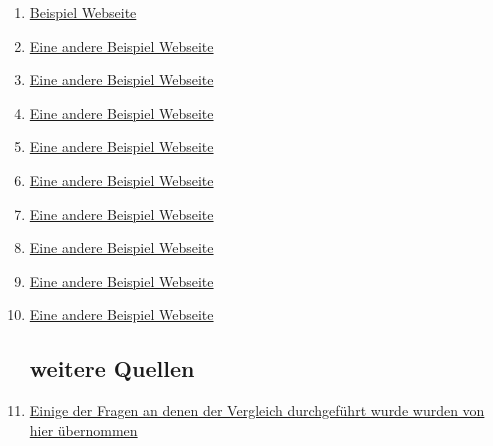 \documentclass[12pt]{article}
\begin{document}
	\begin{enumerate}
		\item \href{https://example.com}{Beispiel Webseite}
		\item \href{https://example.org}{Eine andere Beispiel Webseite}
		\item \href{https://example.org}{Eine andere Beispiel Webseite}
		\item \href{https://example.org}{Eine andere Beispiel Webseite}
		\item \href{https://example.org}{Eine andere Beispiel Webseite}
		\item \href{https://example.org}{Eine andere Beispiel Webseite}
		\item \href{https://example.org}{Eine andere Beispiel Webseite}
		\item \href{https://example.org}{Eine andere Beispiel Webseite}
		\item \href{https://example.org}{Eine andere Beispiel Webseite}
		\item \href{https://example.org}{Eine andere Beispiel Webseite}
		
		\subsection{weitere Quellen}
		\item \href{https://www.gapminder.org/}{Einige der Fragen an denen der Vergleich durchgeführt wurde wurden von hier übernommen}
		
	\end{enumerate}
	
\end{document}
